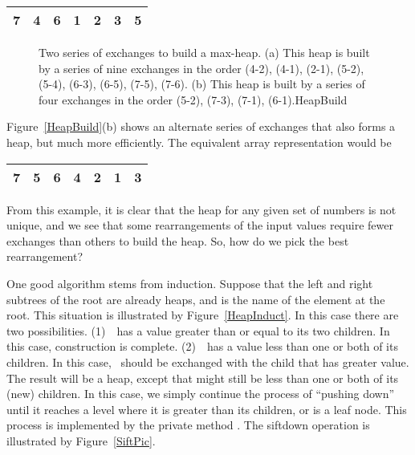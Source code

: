 \begin{center}
\sffamily
\begin{tabular}{|c|c|c|c|c|c|c|}
\hline
\rule{0pt}{12pt}7&4&6&1&2&3&5\\
\hline
\end{tabular}
\end{center}
\vspace{-\smallskipamount}

\begin{figure}
\vspace{-\medskipamount}

{Two series of exchanges to build a max-heap.
(a) This heap is built by a series of nine exchanges in the order
(4-2), (4-1), (2-1), (5-2), (5-4), (6-3), (6-5), (7-5), (7-6).
(b) This heap is built by a series of four exchanges in the order
(5-2), (7-3), (7-1), (6-1).}{HeapBuild}
\bigskip
\end{figure}

Figure~\ref{HeapBuild}(b) shows an alternate series of exchanges
that also forms a heap, but much more efficiently.
The equivalent array representation would be
\vspace{-\medskipamount}

\begin{center}
\sffamily
\begin{tabular}{|c|c|c|c|c|c|c|}
\hline
\rule{0pt}{12pt}7&5&6&4&2&1&3\\
\hline
\end{tabular}
\end{center}
\vspace{-\smallskipamount}

\noindent From this example, it is clear that the heap for any given
set of numbers is not unique, and we see that some rearrangements of
the input values require fewer exchanges than others to build the
heap.
So, how do we pick the best rearrangement?

One good algorithm stems from induction.
Suppose that the left and right subtrees of the root are already
heaps, and  is the name of the element at the root.
This situation is illustrated by Figure~\ref{HeapInduct}.
In this case there are two possibilities.
(1)~~has a value greater than or equal to its two children.
In this case, construction is complete.
(2)~~has a value less than one or both of its children.
In this case, ~should be exchanged with the child that has
greater value.
The result will be a heap, except that 
might still be less than one or both of its (new) children.
In this case, we simply continue the process of ``pushing down''
 until it reaches a level where it is greater than its
children, or is a leaf node.
This process is implemented by the private method
.
The siftdown operation is illustrated by Figure~\ref{SiftPic}.

